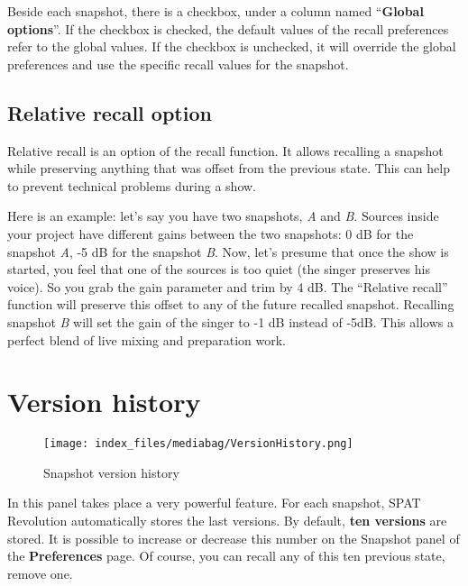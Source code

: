 \documentclass[
  letterpaper,
  DIV=11,
  numbers=noendperiod]{scrreport}
\begin{document}
Beside each snapshot, there is a checkbox, under a column named
``\textbf{Global options}''. If the checkbox is checked, the default
values of the recall preferences refer to the global values. If the
checkbox is unchecked, it will override the global preferences and use
the specific recall values for the snapshot.

\hypertarget{relative-recall-option}{%
\subsection{Relative recall option}\label{relative-recall-option}}

Relative recall is an option of the recall function. It allows recalling
a snapshot while preserving anything that was offset from the previous
state. This can help to prevent technical problems during a show.

Here is an example: let's say you have two snapshots, \emph{A} and
\emph{B}. Sources inside your project have different gains between the
two snapshots: 0 dB for the snapshot \emph{A}, -5 dB for the snapshot
\emph{B}. Now, let's presume that once the show is started, you feel
that one of the sources is too quiet (the singer preserves his voice).
So you grab the gain parameter and trim by 4 dB. The ``Relative recall''
function will preserve this offset to any of the future recalled
snapshot. Recalling snapshot \emph{B} will set the gain of the singer to
-1 dB instead of -5dB. This allows a perfect blend of live mixing and
preparation work.

\hypertarget{version-history}{%
\section{Version history}\label{version-history}}

\begin{figure}

{\centering \texttt{[image: index\_files/mediabag/VersionHistory.png]}

}

\caption{Snapshot version history}

\end{figure}

In this panel takes place a very powerful feature. For each snapshot,
SPAT Revolution automatically stores the last versions. By default,
\textbf{ten versions} are stored. It is possible to increase or decrease
this number on the Snapshot panel of the \textbf{Preferences} page. Of
course, you can recall any of this ten previous state, remove one.
\end{document}
